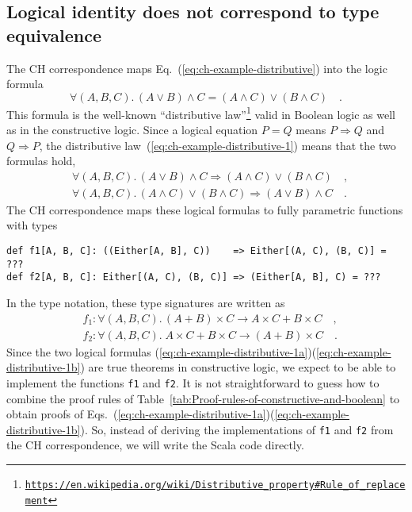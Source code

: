 \subsection{Logical identity does not correspond to type equivalence\label{subsec:Logical-identity-not-type-equivalence}}

The CH correspondence maps Eq.~(\ref{eq:ch-example-distributive})
into the logic formula
\begin{equation}
\forall(A,B,C).\,\left(A\vee B\right)\wedge C=\left(A\wedge C\right)\vee\left(B\wedge C\right)\quad.\label{eq:ch-example-distributive-1}
\end{equation}
This formula is the well-known ``distributive law''\footnote{\texttt{\href{https://en.wikipedia.org/wiki/Distributive_property\#Rule_of_replacement}{https://en.wikipedia.org/wiki/Distributive\_property\#Rule\_of\_replacement}}}
valid in Boolean logic as well as in the constructive logic. Since
a logical equation $P=Q$ means $P\Rightarrow Q$ and $Q\Rightarrow P$,
the distributive law~(\ref{eq:ch-example-distributive-1}) means
that the two formulas hold,
\begin{align}
 & \forall(A,B,C).\,\left(A\vee B\right)\wedge C\Rightarrow\left(A\wedge C\right)\vee\left(B\wedge C\right)\quad,\label{eq:ch-example-distributive-1a}\\
 & \forall(A,B,C).\,\left(A\wedge C\right)\vee\left(B\wedge C\right)\Rightarrow\left(A\vee B\right)\wedge C\quad.\label{eq:ch-example-distributive-1b}
\end{align}
The CH correspondence maps these logical formulas to fully parametric
functions with types
\begin{lstlisting}
def f1[A, B, C]: ((Either[A, B], C))    => Either[(A, C), (B, C)] = ???
def f2[A, B, C]: Either[(A, C), (B, C)] => (Either[A, B], C) = ???
\end{lstlisting}
In the type notation, these type signatures are written as
\begin{align*}
 & f_{1}:\forall(A,B,C).\,\left(A+B\right)\times C\rightarrow A\times C+B\times C\quad,\\
 & f_{2}:\forall(A,B,C).\;A\times C+B\times C\rightarrow\left(A+B\right)\times C\quad.
\end{align*}
Since the two logical formulas (\ref{eq:ch-example-distributive-1a})\textendash (\ref{eq:ch-example-distributive-1b})
are true theorems in constructive logic, we expect to be able to implement
the functions \lstinline!f1! and \lstinline!f2!. It is not straightforward
to guess how to combine the proof rules of Table~\ref{tab:Proof-rules-of-constructive-and-boolean}
to obtain proofs of Eqs.~(\ref{eq:ch-example-distributive-1a})\textendash (\ref{eq:ch-example-distributive-1b}).
So, instead of deriving the implementations of \lstinline!f1! and
\lstinline!f2! from the CH correspondence, we will write the Scala
code directly.

